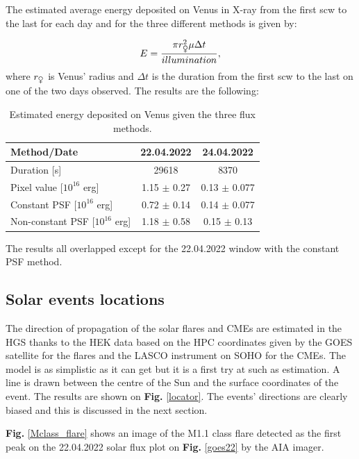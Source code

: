The estimated average energy deposited on Venus in X-ray from the first scw to the last for each day and for the three different methods is given by: 

\begin{equation}
    E = \frac{\pi r_{\venus}^2\mu \Delta t}{illumination},
\end{equation}
where $r_{\venus}$ is Venus' radius and $\Delta t$ is the duration from the first scw to the last on one of the two days observed. The results are the following:

\begin{table}[H]
\centering
\begin{tabular}{@{}lcc@{}}
\toprule
\textbf{Method/Date}             & 22.04.2022    & 24.04.2022     \\ \midrule
Duration [s]                     & 29618         & 8370           \\
Pixel value [$10^{16}$ erg]      & 1.15 $\pm$ 0.27 & 0.13 $\pm$ 0.077 \\
Constant PSF [$10^{16}$ erg] & 0.72 $\pm$ 0.14 & 0.14 $\pm$ 0.077 \\
Non-constant PSF [$10^{16}$ erg]     & 1.18 $\pm$ 0.58 & 0.15 $\pm$ 0.13  \\ \bottomrule
\end{tabular}
\caption{Estimated energy deposited on Venus given the three flux methods.}
\label{depo}
\end{table}

The results all overlapped except for the 22.04.2022 window with the constant PSF method.

    
    \subsection{Solar events locations}
    The direction of propagation of the solar flares and CMEs are estimated in the HGS thanks to the HEK data based on the HPC coordinates given by the GOES satellite for the flares and the LASCO instrument on SOHO for the CMEs. The model is as simplistic as it can get but it is a first try at such as estimation. A line is drawn between the centre of the Sun and the surface coordinates of the event. The results are shown on \textbf{Fig.} \ref{locator}. The events' directions are clearly biased and this is discussed in the next section. 
    
    \textbf{Fig.} \ref{Mclass_flare} shows an image of the M1.1 class flare detected as the first peak on the 22.04.2022 solar flux plot on \textbf{Fig.} \ref{goes22} by the AIA imager.

